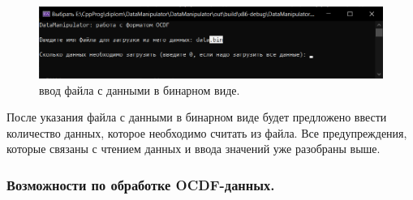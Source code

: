 {  \begin{figure}[H]
    \centering
    \includegraphics[width=\textwidth]{images/forDataManipulator/readOCDFbin.png}
    \caption{ввод файла с данными в бинарном виде.} 
    \label{fig:readOCDFbin}
  \end{figure}

  \par После указания файла с данными в бинарном виде будет предложено ввести количество данных, которое необходимо считать из файла. Все предупреждения, которые связаны с чтением данных и ввода значений уже разобраны выше. 

  \par
}

\subsubsection{ \standartTitleFont
  Возможности по обработке OCDF-данных. 
}

